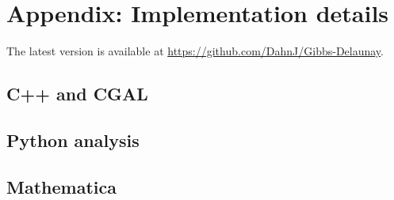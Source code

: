 \chapter{Appendix: Implementation details}\label{appendix:implementation}
The latest version is available at \url{https://github.com/DahnJ/Gibbs-Delaunay}.
\section{C++ and CGAL}
\tbd
\section{Python analysis}
\tbd
\section{Mathematica}
\tbd

